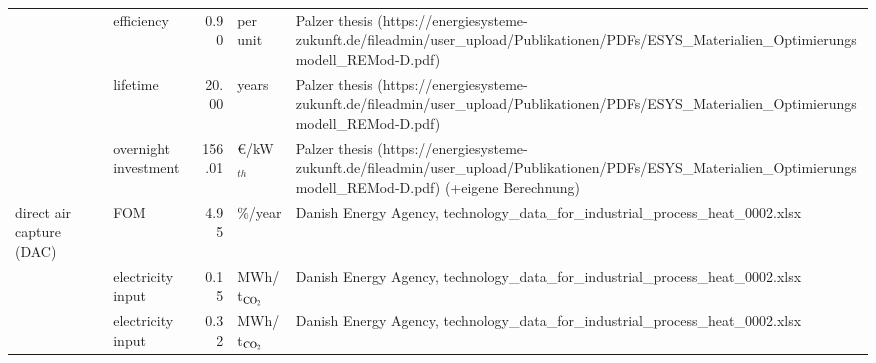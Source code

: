 \begin{longtable}{p{4cm}p{4cm}rp{3cm}p{10cm}}
                      & efficiency &         0.90 &                      per unit &                                                                                                                                                                                       Palzer thesis (https://energiesysteme-zukunft.de/fileadmin/user\_upload/Publikationen/PDFs/ESYS\_Materialien\_Optimierungsmodell\_REMod-D.pdf) \\
                      & lifetime &        20.00 &                         years &                                                                                                                                                                                       Palzer thesis (https://energiesysteme-zukunft.de/fileadmin/user\_upload/Publikationen/PDFs/ESYS\_Materialien\_Optimierungsmodell\_REMod-D.pdf) \\
                      & overnight investment &       156.01 &               \euro/kW$_{th}$ &                                                                                                                                                                  Palzer thesis (https://energiesysteme-zukunft.de/fileadmin/user\_upload/Publikationen/PDFs/ESYS\_Materialien\_Optimierungsmodell\_REMod-D.pdf) (+eigene Berechnung) \\
direct air capture (DAC) & FOM &         4.95 &                       \%/year &                                                                                                                                                                                                                                                    Danish Energy Agency, technology\_data\_for\_industrial\_process\_heat\_0002.xlsx \\
                      & electricity input &         0.15 &            MWh/t$_{\ce{CO2}}$ &                                                                                                                                                                                                                                                    Danish Energy Agency, technology\_data\_for\_industrial\_process\_heat\_0002.xlsx \\
                      & electricity input &         0.32 &            MWh/t$_{\ce{CO2}}$ &                                                                                                                                                                                                                                                    Danish Energy Agency, technology\_data\_for\_industrial\_process\_heat\_0002.xlsx \\

\end{longtable}
